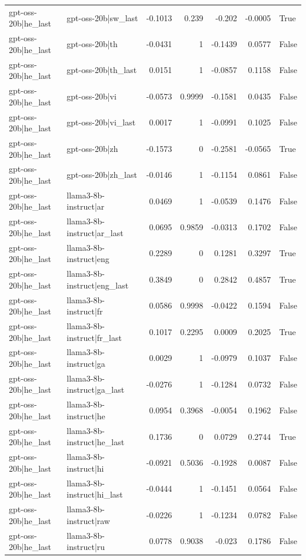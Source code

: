 \begin{table}
\begin{tabular}{l l r r r r l}
gpt-oss-20b|he_last & gpt-oss-20b|sw_last & -0.1013 & 0.239 & -0.202 & -0.0005 & True \\
gpt-oss-20b|he_last & gpt-oss-20b|th & -0.0431 & 1 & -0.1439 & 0.0577 & False \\
gpt-oss-20b|he_last & gpt-oss-20b|th_last & 0.0151 & 1 & -0.0857 & 0.1158 & False \\
gpt-oss-20b|he_last & gpt-oss-20b|vi & -0.0573 & 0.9999 & -0.1581 & 0.0435 & False \\
gpt-oss-20b|he_last & gpt-oss-20b|vi_last & 0.0017 & 1 & -0.0991 & 0.1025 & False \\
gpt-oss-20b|he_last & gpt-oss-20b|zh & -0.1573 & 0 & -0.2581 & -0.0565 & True \\
gpt-oss-20b|he_last & gpt-oss-20b|zh_last & -0.0146 & 1 & -0.1154 & 0.0861 & False \\
gpt-oss-20b|he_last & llama3-8b-instruct|ar & 0.0469 & 1 & -0.0539 & 0.1476 & False \\
gpt-oss-20b|he_last & llama3-8b-instruct|ar_last & 0.0695 & 0.9859 & -0.0313 & 0.1702 & False \\
gpt-oss-20b|he_last & llama3-8b-instruct|eng & 0.2289 & 0 & 0.1281 & 0.3297 & True \\
gpt-oss-20b|he_last & llama3-8b-instruct|eng_last & 0.3849 & 0 & 0.2842 & 0.4857 & True \\
gpt-oss-20b|he_last & llama3-8b-instruct|fr & 0.0586 & 0.9998 & -0.0422 & 0.1594 & False \\
gpt-oss-20b|he_last & llama3-8b-instruct|fr_last & 0.1017 & 0.2295 & 0.0009 & 0.2025 & True \\
gpt-oss-20b|he_last & llama3-8b-instruct|ga & 0.0029 & 1 & -0.0979 & 0.1037 & False \\
gpt-oss-20b|he_last & llama3-8b-instruct|ga_last & -0.0276 & 1 & -0.1284 & 0.0732 & False \\
gpt-oss-20b|he_last & llama3-8b-instruct|he & 0.0954 & 0.3968 & -0.0054 & 0.1962 & False \\
gpt-oss-20b|he_last & llama3-8b-instruct|he_last & 0.1736 & 0 & 0.0729 & 0.2744 & True \\
gpt-oss-20b|he_last & llama3-8b-instruct|hi & -0.0921 & 0.5036 & -0.1928 & 0.0087 & False \\
gpt-oss-20b|he_last & llama3-8b-instruct|hi_last & -0.0444 & 1 & -0.1451 & 0.0564 & False \\
gpt-oss-20b|he_last & llama3-8b-instruct|raw & -0.0226 & 1 & -0.1234 & 0.0782 & False \\
gpt-oss-20b|he_last & llama3-8b-instruct|ru & 0.0778 & 0.9038 & -0.023 & 0.1786 & False \\

\end{tabular}
\end{table}
